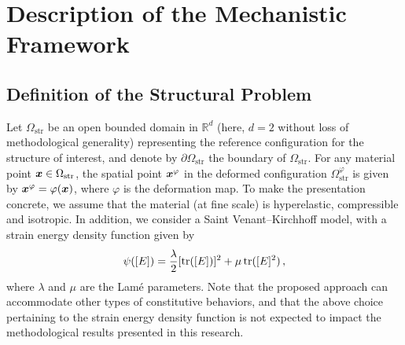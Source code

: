
\section{Description of the Mechanistic Framework}\label{sec:mechanics}
\subsection{Definition of the Structural Problem}\label{subsec:def-struc-pb}

Let $\Omega_\text{str}$ be an open bounded domain in $\mathbb{R}^d$ (here, $d = 2$ without loss of methodological generality) representing the reference configuration for the structure of interest, and denote by $\partial \Omega_\text{str}$ the boundary of $\Omega_\text{str}$. For any material point ${\boldsymbol{x}} \in \Omega_\text{str}$, the spatial point ${\boldsymbol{x}}^\varphi$ in the deformed configuration $\Omega_{\text{str}}^\varphi$ is given by ${\boldsymbol{x}}^\varphi = \varphi ({\boldsymbol{x}})$, where $\varphi$ is the deformation map. To make the presentation concrete, we assume that the material (at fine scale) is hyperelastic, compressible and isotropic. In addition, we consider a Saint Venant–Kirchhoff model, with a strain energy density function given by
\begin{align}
    \psi([E]) = \frac{\lambda}{2} [\textnormal{tr}([E])]^2 + \mu \, \textnormal{tr}([E]^2)\,,\label{eq: strain energy density}
\end{align}
where $\lambda$ and $\mu$ are the Lamé parameters. Note that the proposed approach can accommodate other types of constitutive behaviors, and that the above choice pertaining to the strain energy density function is not expected to impact the methodological results presented in this research. 

